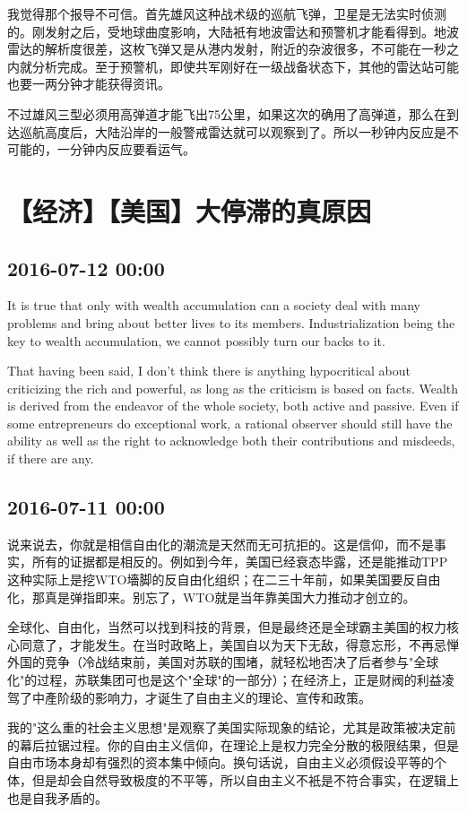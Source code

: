 \documentclass[twocolumn]{ctexart}
\begin{document}
我觉得那个报导不可信。首先雄风这种战术级的巡航飞弹，卫星是无法实时侦测的。刚发射之后，受地球曲度影响，大陆衹有地波雷达和预警机才能看得到。地波雷达的解析度很差，这枚飞弹又是从港内发射，附近的杂波很多，不可能在一秒之内就分析完成。至于预警机，即使共军刚好在一级战备状态下，其他的雷达站可能也要一两分钟才能获得资讯。

不过雄风三型必须用高弹道才能飞出75公里，如果这次的确用了高弹道，那么在到达巡航高度后，大陆沿岸的一般警戒雷达就可以观察到了。所以一秒钟内反应是不可能的，一分钟内反应要看运气。\section*{【经济】【美国】大停滞的真原因}
\subsection*{2016-07-12 00:00}
It is true that only with wealth accumulation can a society deal with many problems and bring about better lives to its members. Industrialization being the key to wealth accumulation, we cannot possibly turn our backs to it.

That having been said, I don't think there is anything hypocritical about criticizing the rich and powerful, as long as the criticism is based on facts. Wealth is derived from the endeavor of the whole society, both active and passive. Even if some entrepreneurs do exceptional work, a rational observer should still have the ability as well as the right to acknowledge both their contributions and misdeeds, if there are any.\subsection*{2016-07-11 00:00}
说来说去，你就是相信自由化的潮流是天然而无可抗拒的。这是信仰，而不是事实，所有的证据都是相反的。例如到今年，美国已经衰态毕露，还是能推动TPP这种实际上是挖WTO墻脚的反自由化组织；在二三十年前，如果美国要反自由化，那真是弹指即来。别忘了，WTO就是当年靠美国大力推动才创立的。

全球化、自由化，当然可以找到科技的背景，但是最终还是全球霸主美国的权力核心同意了，才能发生。在当时政略上，美国自以为天下无敌，得意忘形，不再忌惮外国的竞争（冷战结束前，美国对苏联的围堵，就轻松地否决了后者参与"全球化"的过程，苏联集团可也是这个"全球"的一部分）；在经济上，正是财阀的利益凌驾了中產阶级的影响力，才诞生了自由主义的理论、宣传和政策。

我的"这么重的社会主义思想"是观察了美国实际现象的结论，尤其是政策被决定前的幕后拉锯过程。你的自由主义信仰，在理论上是权力完全分散的极限结果，但是自由市场本身却有强烈的资本集中倾向。换句话说，自由主义必须假设平等的个体，但是却会自然导致极度的不平等，所以自由主义不衹是不符合事实，在逻辑上也是自我矛盾的。
\end{document}
